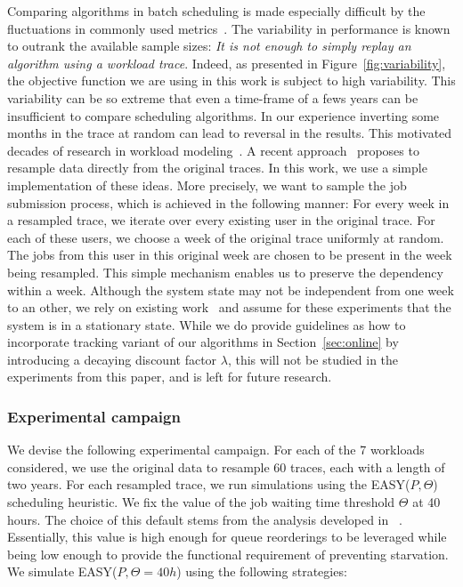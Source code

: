 \documentclass[sigconf,anonymous]{acmart}
\begin{document}
Comparing algorithms in batch scheduling is made especially difficult by the
fluctuations in commonly used metrics~\cite{jsm}. The variability in
performance is known to outrank the available sample sizes: \textit{It is not
enough to simply replay an algorithm using a workload trace}. Indeed, as
presented in Figure~\ref{fig:variability}, the objective function we are using
in this work is subject to high variability. This variability can be so extreme
that even a time-frame of a fews years can be insufficient to compare scheduling
algorithms. In our experience inverting some months in the trace at random can
lead to reversal in the results. This motivated decades of research in workload
modeling~\cite{feitbook}. A recent approach~\cite{feitresampling} proposes to
resample data directly from the original traces. In this work, we use a simple
implementation of these ideas.  More precisely, we want to sample the job
submission process, which is achieved in the following manner: For every week in
a resampled trace, we iterate over every existing user in the original trace.
For each of these users, we choose a week of the original trace uniformly at
random. The jobs from this user in this original week are chosen to be present
in the week being resampled.  This simple mechanism enables us to preserve the
dependency within a week.  Although the system state may not be independent
from one week to an other, we rely on existing work~\cite{jsspp17} and assume
for these experiments that the system is in a stationary state. While we
do provide guidelines as how to incorporate tracking variant of our algorithms
in Section~\ref{sec:online} by introducing a decaying discount factor $\lambda$,
this will not be studied in the experiments from this paper, and is left for
future research.


\subsubsection{Experimental campaign}

We devise the following experimental campaign. For each of the 7 workloads
considered, we use the original data to resample 60 traces, each with a length
of two years. For each resampled trace, we run simulations using the
EASY($P,\Theta$) scheduling heuristic. We fix the value of the job waiting time
threshold $\Theta$ at 40 hours. The choice of this default
stems from the analysis developed in ~\cite{jsspp17}. Essentially, this value is high
enough for queue reorderings to be leveraged while being low enough to provide
the functional requirement of preventing starvation. We simulate
EASY($P,\Theta=40h$) using the following strategies:
\end{document}
